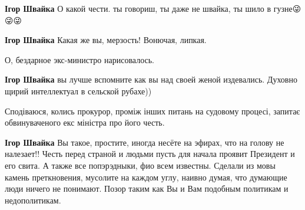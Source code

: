 \begin{itemize}
\begin{itemize}
 
\textbf{Ігор Швайка} О какой чести. ты говориш, ты даже не швайка, ты шило в гузне😜😜😜

 
\textbf{Ігор Швайка} Какая же вы, мерзость! Вонючая, липкая.

 
О, бездарное экс-министро нарисовалось.

 
\textbf{Ігор Швайка} вы лучше вспомните как вы над своей женой издевались. Духовно щирий интеллектуал в сельской рубахе))

 
Сподіваюся, колись прокурор, проміж інших питань на судовому процесі, запитає обвинуваченого екс міністра про його честь.

 
\textbf{Ігор Швайка} Вы такое, простите, иногда несёте на эфирах, что на голову
не налезает!! Честь перед страной и людьми пусть для начала проявит Президент и
его свита. А также все попэрэдныки, фио всем известны. Сделали из мовы камень
преткновения, мусолите на каждом углу, наивно думая, что думающие люди ничего
не понимают. Позор таким как Вы и Вам подобным политикам и недополитикам.



\end{itemize}
\end{itemize}
